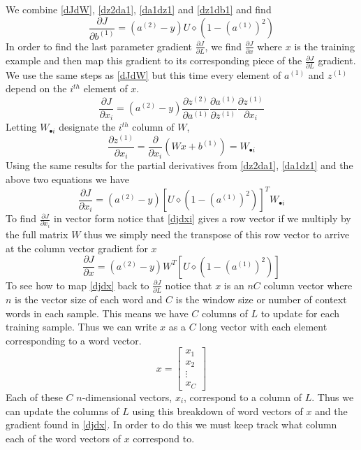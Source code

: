\documentclass{article}
\begin{document}
We combine \eqref{dJdW}, \eqref{dz2da1}, \eqref{da1dz1} and \eqref{dz1db1} and find
\begin{equation}\label{djdb1}
\frac{\partial J}{\partial b^{(1)}} = \left(a^{(2)} - y\right) U \diamond\left( 1-(a^{(1)})^2 \right)
\end{equation}
In order to find the last parameter gradient \( \frac{\partial J}{\partial L} \), we find \( \frac{\partial J}{\partial x} \) where \(x\) is the training example and then map this gradient to its corresponding piece of the \( \frac{\partial J}{\partial L} \) gradient.  We use the same steps as \eqref{dJdW} but this time every element of \(a^{(1)} \) and \( z^{(1)}\) depend on the \(i^{th}\) element of \(x\).
\begin{equation}
\frac{\partial J}{\partial x_{i}} = \left(a^{(2)} - y\right)\frac{\partial z^{(2)}}{\partial a^{(1)}}\frac{\partial a^{(1)}}{\partial z^{(1)}}\frac{\partial z^{(1)}}{\partial x_{i}}
\end{equation}
Letting \( W_{\bullet i} \) designate the \(i^{th}\) column of \(W\),
\begin{equation}
\frac{\partial z^{(1)}}{\partial x_i} = \frac{\partial}{\partial x_i} \left( Wx+b^{(1)}\right) = W_{\bullet i}
\end{equation}
Using the same results for the partial derivatives from \eqref{dz2da1}, \eqref{da1dz1} and the above two equations we have
\begin{equation}\label{djdxi}
\frac{\partial J}{\partial x_i} = \left(a^{(2)} - y\right) \left[U \diamond\left( 1-(a^{(1)})^2 \right)\right]^T W_{\bullet i}
\end{equation}
To find \(\frac{\partial J}{\partial x_i}\) in vector form notice that \eqref{djdxi} gives a row vector if we multiply by the full matrix \(W\) thus we simply need the transpose of this row vector to arrive at the column vector gradient for \(x\)
\begin{equation}\label{djdx}
\frac{\partial J}{\partial x} = \left(a^{(2)} - y\right) W^T \left[ U \diamond\left( 1-(a^{(1)})^2 \right)\right]
\end{equation}
To see how to map \eqref{djdx} back to \( \frac{\partial J}{\partial L}\) notice that \(x\) is an \( nC\) column vector where \(n\) is the vector size of each word and \(C\) is the window size or number of context words in each sample.  This means we have \(C\) columns of \( L \) to update for each training sample.  Thus we can write \(x\) as a \(C\) long vector with each element corresponding to a word vector.
\begin{displaymath}
x = \begin{bmatrix}  x_{1}\\  x_{2} \\ \vdots \\ x_{C}\end{bmatrix}
\end{displaymath}
Each of these \(C\)  \(n\)-dimensional vectors, \(x_{i} \), correspond to a column of \(L\).  Thus we can update the columns of \(L\) using this breakdown of word vectors of \(x\) and the gradient found in \eqref{djdx}.  In order to do this we must keep track what column each of the word vectors of \(x\) correspond to.
\end{document}

